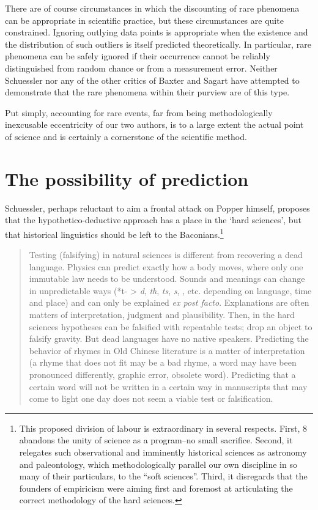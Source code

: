 There are of course circumstances in which the discounting of rare phenomena can be appropriate in scientific practice, but these circumstances are quite constrained. 
Ignoring outlying data points is appropriate when the existence and the distribution of such outliers is itself predicted theoretically. 
In particular, rare phenomena can be safely ignored if their occurrence cannot be reliably distinguished from random chance or from a measurement error. 
Neither Schuessler nor any of the other critics of Baxter and Sagart have attempted to demonstrate that the rare phenomena within their purview are of this type. 

Put simply, accounting for rare events, far from being methodologically inexcusable eccentricity of our two authors, is to a large extent the actual point of science and is certainly a cornerstone of the scientific method. 

\section{The possibility of prediction}
Schuessler, perhaps reluctant to aim a frontal attack on Popper himself, proposes that the hypothetico-deductive approach has a place in the `hard sciences', but that historical linguistics should be left to the Baconians.\footnote{This proposed division of labour is extraordinary in several respects. First, 8 abandons the unity of science as a program--no small sacrifice. Second, it relegates such observational and imminently historical sciences as astronomy and paleontology, which methodologically parallel our own discipline in so many of their particulars, to the “soft sciences”. Third, it disregards that the founders of empiricism were aiming first and foremost at articulating the correct methodology of the hard sciences.}

\begin{quote}
Testing (falsifying) in natural sciences is different from recovering a dead language.
Physics can predict exactly how a body moves, where only one immutable
law needs to be understood. Sounds and meanings can change in unpredictable
ways (*t- > \textit{d}, \textit{th}, \textit{ts}, \textit{s}, \textit{{}}, etc. depending on language, time and place) and can
only be explained \textit{ex post facto}. Explanations are often matters of interpretation,
judgment and plausibility. Then, in the hard sciences hypotheses can be falsified
with repeatable tests; drop an object to falsify gravity. But dead languages have no
native speakers. Predicting the behavior of rhymes in Old Chinese literature is a
matter of interpretation (a rhyme that does not fit may be a bad rhyme, a word may
have been pronounced differently, graphic error, obsolete word). Predicting that a
certain word will not be written in a certain way in manuscripts that may come to
light one day does not seem a viable test or falsification. \citep[577]{Schuessler2015BSrv}
\end{quote}

